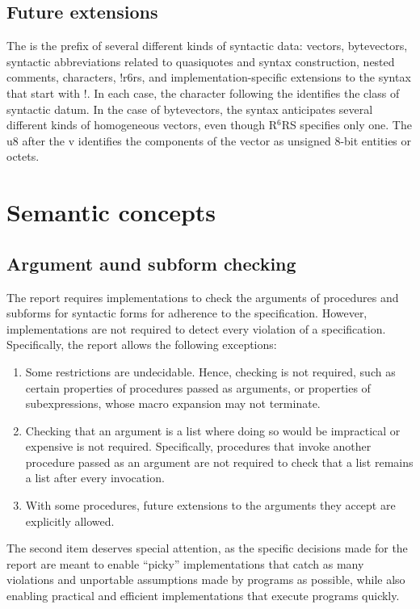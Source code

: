 \documentclass[twoside,twocolumn]{algol60}
\newcommand{\rn}[1]{R$^{#1}$RS}
\begin{document}
\section{Future extensions}

The {\cf\sharpsign} is the prefix of several different kinds of
syntactic data: vectors, bytevectors, syntactic abbreviations related
to quasiquotes and syntax construction, nested comments, characters,
{\cf\sharpsign!r6rs}, and implementation-specific extensions to the
syntax that start with {\cf\sharpsign!}.  In each case, the character
following the {\cf\sharpsign} identifies the class of syntactic datum.
In the case of bytevectors, the syntax anticipates several different
kinds of homogeneous vectors, even though \rn{6} specifies only
one. The {\cf u8} after the {\cf\sharpsign{}v} identifies the
components of the vector as unsigned 8-bit entities or octets.


\chapter{Semantic concepts}

\section{Argument aund subform checking}
\label{argumentchecking}

The report requires implementations to check the arguments of
procedures and subforms for syntactic forms for adherence to the
specification.  However, implementations are not required to detect
every violation of a specification.  Specifically, the report allows
the following exceptions:
%
\begin{enumerate}
\item Some restrictions are undecidable.  Hence, checking is not
  required, such as certain properties of procedures passed as
  arguments, or properties of subexpressions, whose macro expansion
  may not terminate.
\item Checking that an argument is a list where doing so would be
  impractical or expensive is not required.  Specifically, procedures that
  invoke another procedure passed as an argument are not required to
  check that a list remains a list after every invocation.
\item With some procedures, future extensions to the arguments they
  accept are explicitly allowed.
\end{enumerate}
%
The second item deserves special attention, as the specific decisions
made for the report are meant to enable ``picky'' implementations that
catch as many violations and unportable assumptions made by programs
as possible, while also enabling practical and efficient
implementations that execute programs quickly.
\end{document}
